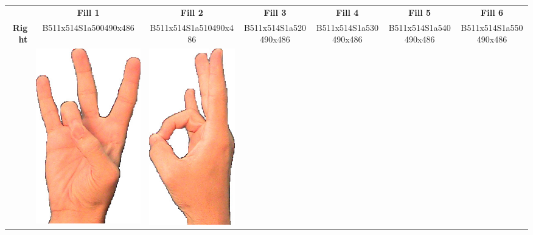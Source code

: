 \documentclass{article}
\begin{document}
\begin{center}
\begin{tabular}{r*{6}{c}}
&\textbf{Fill 1}&\textbf{Fill 2}&\textbf{Fill 3}&\textbf{Fill 4}&\textbf{Fill 5}&\textbf{Fill 6}\\
\multirow{2}{*}{\textbf{Right}}&
B511x514S1a500490x486&
B511x514S1a510490x486&
B511x514S1a520490x486&
B511x514S1a530490x486&
B511x514S1a540490x486&
B511x514S1a550490x486\\
&
\includegraphics[scale=0.1]{images/07-01-1.jpg}&
\includegraphics[scale=0.1]{images/07-01-2.jpg}&

\end{tabular}
\end{center}
\end{document}
